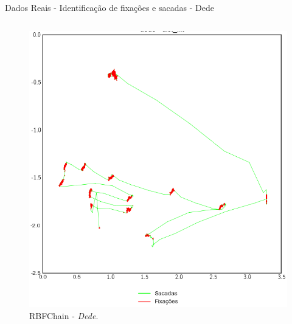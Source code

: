 \documentclass[10pt]{beamer}
\begin{document}
\begin{frame}{Dados Reais - Identificação de fixações e sacadas -  Dede}
\begin{columns}
\begin{column}{0.48\textwidth}
\begin{figure}[H]
\begin{center}
                    \includegraphics[scale=0.28]{imagens/dede_rbfchain.png}
                    \caption{RBFChain - \textit{Dede}.}
                \end{center}
            \end{figure}
        \end{column}
    \end{columns}
\end{frame}
\end{document}
